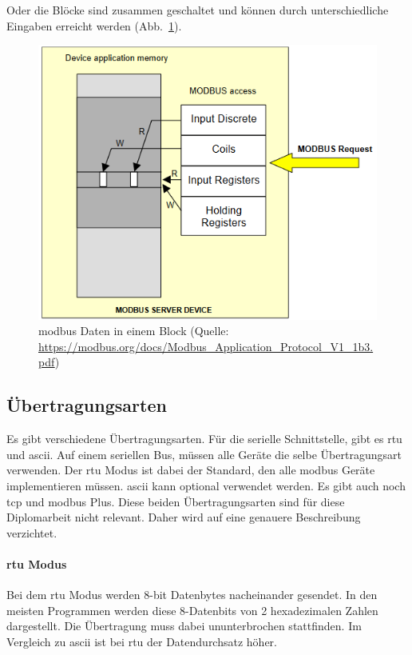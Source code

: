 Oder die Blöcke sind zusammen geschaltet und können durch unterschiedliche Eingaben erreicht werden (Abb.~\ref{fig:modbus_register_one_block}).
\begin{figure}[H]
	\centering
	\includegraphics[width=0.4\linewidth]{Bilder/Modbus_Data_Model_with_one_block}
	\caption{\gls{modbus} Daten in einem Block (Quelle: \url{https://modbus.org/docs/Modbus_Application_Protocol_V1_1b3.pdf})}
	\label{fig:modbus_register_one_block}
\end{figure}

\subsection{Übertragungsarten} \label{modbus_uebertragungsarten}
Es gibt verschiedene Übertragungsarten. Für die serielle Schnittstelle, gibt es \acf{rtu} und \acf{ascii}. Auf einem seriellen Bus, müssen alle Geräte die selbe Übertragungsart verwenden. Der \acs{rtu} Modus ist dabei der Standard, den alle \gls{modbus} Geräte implementieren müssen. \acs{ascii} kann optional verwendet werden. \newline Es gibt auch noch \acs{tcp} und \gls{modbus} Plus. Diese beiden Übertragungsarten sind für diese Diplomarbeit nicht relevant. Daher wird auf eine genauere Beschreibung verzichtet.

\paragraph{\acs{rtu} Modus}
Bei dem \acs{rtu} Modus werden 8-bit Datenbytes nacheinander gesendet. In den meisten Programmen werden diese 8-Datenbits von 2 hexadezimalen Zahlen dargestellt. Die Übertragung muss dabei ununterbrochen stattfinden. Im Vergleich zu \acs{ascii} ist bei \acs{rtu} der Datendurchsatz höher. 


